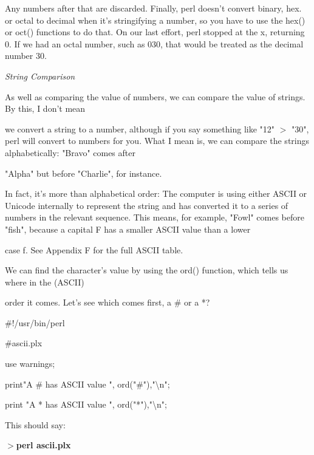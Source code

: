 \documentclass[a4paper,11pt]{book}
\begin{document}
\noindent Any numbers after that are discarded. Finally, perl doesn't convert binary, hex. or octal to decimal when it's stringifying a number, so you have to use the hex() or oct() functions to do that. On our last effort, perl stopped at the x, returning 0. If we had an octal number, such as 030, that would be treated as the decimal number 30.

\noindent 

\noindent \textit{String Comparison}

\noindent As well as comparing the value of numbers, we can compare the value of strings. By this, I don't mean

\noindent we convert a string to a number, although if you say something like "12" $>$ "30", perl will convert to numbers for you. What I mean is, we can compare the strings alphabetically: "Bravo" comes after

\noindent "Alpha" but before "Charlie", for instance.

\noindent 

\noindent In fact, it's more than alphabetical order: The computer is using either ASCII or Unicode internally to represent the string and has converted it to a series of numbers in the relevant sequence. This means, for example, "Fowl" comes before "fish", because a capital F has a smaller ASCII value than a lower

\noindent case f. See Appendix F for the full ASCII table.

\noindent 

\noindent We can find the character's value by using the ord() function, which tells us where in the (ASCII)

\noindent order it comes. Let's see which comes first, a \# or a *?

\noindent 

\noindent \#!/usr/bin/perl

\noindent \#ascii.plx

\noindent use warnings;

\noindent print"A \# has ASCII value ", ord("\#"),"\textbackslash n";

\noindent print "A * has ASCII value ", ord("*"),"\textbackslash n";

\noindent 

\noindent 

\noindent This should say:

\noindent 

\noindent $>$\textbf{perl ascii.plx}
\end{document}
